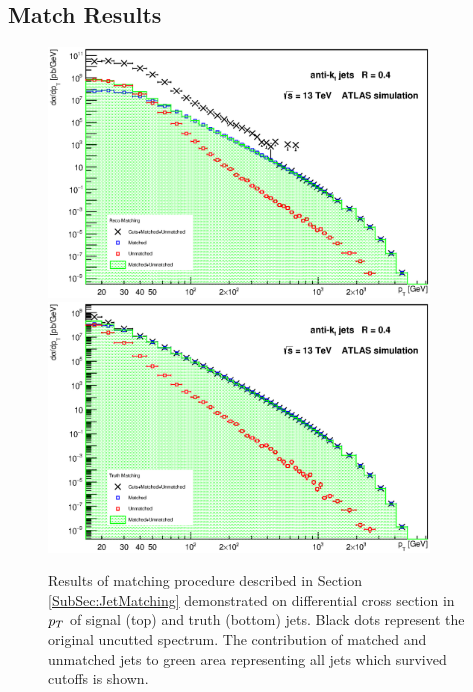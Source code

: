 \begin{appendices}
\section{Match Results}
\label{sed:MatchResults}
\begin{figure}[H]
  \centering
  \includegraphics[width=0.9\textwidth]{Chapter3/SignalMatching.eps}
  \includegraphics[width=0.9\textwidth]{Chapter3/TruthMatching.eps}
  \caption{Results of matching procedure described in Section
  \ref{SubSec:JetMatching} demonstrated on differential cross section in $p_{T}$ of
  signal (top) and truth (bottom) jets. Black dots represent the original
  uncutted spectrum. The contribution of matched and unmatched jets to
  green area representing all jets which survived cutoffs is shown.}
  \label{fig:Matching}
\end{figure}


\end{appendices}
